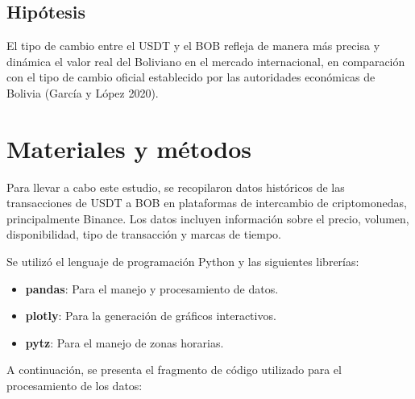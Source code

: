 \documentclass[
  letterpaper,
  DIV=11,
  numbers=noendperiod]{scrartcl}
\providecommand{\tightlist}{%
  \setlength{\itemsep}{0pt}\setlength{\parskip}{0pt}}\usepackage{longtable,booktabs,array}
\begin{document}
\subsection{Hipótesis}\label{hipuxf3tesis}

El tipo de cambio entre el USDT y el BOB refleja de manera más precisa y
dinámica el valor real del Boliviano en el mercado internacional, en
comparación con el tipo de cambio oficial establecido por las
autoridades económicas de Bolivia (García y López 2020).

\section{Materiales y métodos}\label{materiales-y-muxe9todos}

Para llevar a cabo este estudio, se recopilaron datos históricos de las
transacciones de USDT a BOB en plataformas de intercambio de
criptomonedas, principalmente Binance. Los datos incluyen información
sobre el precio, volumen, disponibilidad, tipo de transacción y marcas
de tiempo.

Se utilizó el lenguaje de programación Python y las siguientes
librerías:

\begin{itemize}
\tightlist
\item
  \textbf{pandas}: Para el manejo y procesamiento de datos.
\item
  \textbf{plotly}: Para la generación de gráficos interactivos.
\item
  \textbf{pytz}: Para el manejo de zonas horarias.
\end{itemize}

A continuación, se presenta el fragmento de código utilizado para el
procesamiento de los datos:
\end{document}
